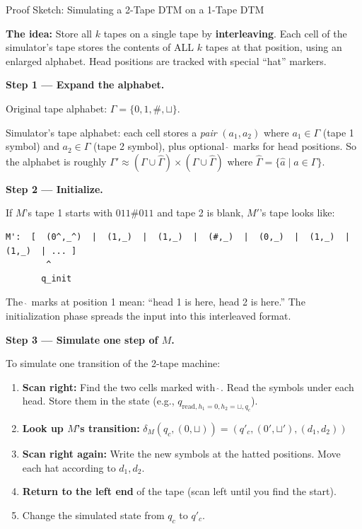 \documentclass[11pt,a4paper]{article}
\begin{document}
\begin{examplebox}{{Proof Sketch: Simulating a 2-Tape DTM on a 1-Tape DTM}}

\textbf{The idea:} Store all $k$ tapes on a single tape by \textbf{interleaving}. Each cell of the simulator's tape stores the contents of ALL $k$ tapes at that position, using an enlarged alphabet. Head positions are tracked with special ``hat'' markers.

\textbf{Step 1 --- Expand the alphabet.}

Original tape alphabet: $\Gamma = \{0, 1, \#, \sqcup\}$.

Simulator's tape alphabet: each cell stores a \textit{pair} $(a_1, a_2)$ where $a_1 \in \Gamma$ (tape 1 symbol) and $a_2 \in \Gamma$ (tape 2 symbol), plus optional $\hat{~}$ marks for head positions. So the alphabet is roughly $\Gamma' \approx (\Gamma \cup \hat{\Gamma}) \times (\Gamma \cup \hat{\Gamma})$ where $\hat{\Gamma} = \{\hat{a} \mid a \in \Gamma\}$.

\textbf{Step 2 --- Initialize.}

If $M$'s tape 1 starts with $011\#011$ and tape 2 is blank, $M'$'s tape looks like:

\begin{lstlisting}
M':  [  (0^,_^)  |  (1,_)  |  (1,_)  |  (#,_)  |  (0,_)  |  (1,_)  |  (1,_)  | ... ]
        ^
       q_init
\end{lstlisting}

The $\hat{~}$ marks at position 1 mean: ``head 1 is here, head 2 is here.'' The initialization phase spreads the input into this interleaved format.

\textbf{Step 3 --- Simulate one step of $M$.}

To simulate one transition of the 2-tape machine:

\begin{enumerate}[nosep]
\item \textbf{Scan right:} Find the two cells marked with $\hat{~}$. Read the symbols under each head. Store them in the state (e.g., $q_{\text{read}, h_1=0, h_2=\sqcup, q_c}$).
\item \textbf{Look up $M$'s transition:} $\delta_M(q_c, (0, \sqcup)) = (q'_c, (0', \sqcup'), (d_1, d_2))$
\item \textbf{Scan right again:} Write the new symbols at the hatted positions. Move each hat according to $d_1, d_2$.
\item \textbf{Return to the left end} of the tape (scan left until you find the start).
\item Change the simulated state from $q_c$ to $q'_c$.
\end{enumerate}


\end{examplebox}
\end{document}
